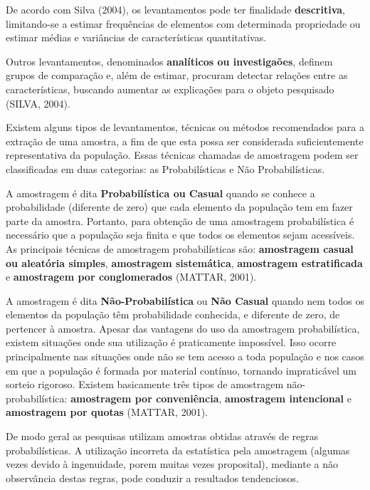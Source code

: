 De acordo com Silva (2004), os levantamentos pode ter finalidade
\textbf{descritiva}, limitando-se a estimar frequências de
elementos com determinada propriedade ou estimar médias e
variâncias de características quantitativas.\vskip0.3cm

Outros levantamentos, denominados \textbf{analíticos ou
investigaões}, definem grupos de comparação e, além de estimar,
procuram detectar relações entre as características, buscando
aumentar as explicações para o objeto pesquisado (SILVA,
2004).\vskip0.3cm

\inic Existem alguns tipos de levantamentos, técnicas ou métodos
recomendados para a extração de uma amostra, a fim de que esta
possa ser considerada suficientemente representativa da população.
Essas técnicas chamadas de amostragem podem ser classificadas em
duas categorias: as Probabilísticas e Não
Probabilísticas.\vskip0.3cm




A amostragem é dita \textbf{Probabilística ou Casual} quando se
conhece a probabilidade (diferente de zero) que cada elemento da
população tem em fazer parte da amostra. Portanto, para obtenção
de uma amostragem probabilística é necessário que a população seja
finita e que todos os elementos sejam acessíveis. As principais
técnicas de amostragem probabilísticas são: \textbf{amostragem
casual ou aleatória simples}, \textbf{amostragem sistemática},
\textbf{amostragem estratificada} e \textbf{amostragem por
conglomerados} (MATTAR, 2001).\vskip0.3cm

A amostragem é dita \textbf{Não-Probabilística} ou \textbf{Não
Casual} quando nem todos os elementos da população têm
probabilidade conhecida, e diferente de zero, de pertencer à
amostra. Apesar das vantagens do uso da amostragem probabilística,
existem situações onde sua utilização é praticamente impossível.
Isso ocorre principalmente nas situações onde não se tem acesso a
toda população e nos casos em que a população é formada por
material contínuo, tornando impraticável um sorteio rigoroso.
Existem basicamente três tipos de amostragem não-probabilística:
\textbf{amostragem por conveniência}, \textbf{amostragem
intencional} e \textbf{amostragem por quotas} (MATTAR,
2001).\vskip0.3cm


De modo geral as pesquisas utilizam amostras obtidas através de regras probabilísticas. A utilização incorreta da estatística pela amostragem (algumas vezes devido à ingenuidade, porem muitas vezes proposital), mediante a não observância destas regras, pode conduzir a resultados tendenciosos.\vskip0.3cm


